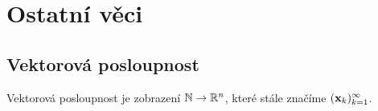 \section{Ostatní věci}

\subsection*{Vektorová posloupnost}

Vektorová posloupnost je zobrazení $\mathbb{N} \to \mathbb{R}^n$, které stále značíme
$(\mathbf{x}_k)_{k=1}^\infty$.

\pagebreak